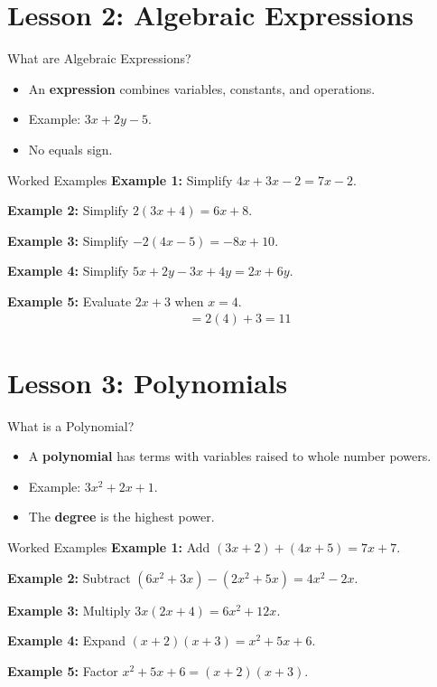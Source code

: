 \documentclass{beamer}
\begin{document}
\section{Lesson 2: Algebraic Expressions}

\begin{frame}{What are Algebraic Expressions?}
\begin{itemize}
    \item An \textbf{expression} combines variables, constants, and operations.
    \item Example: $3x + 2y - 5$.
    \item No equals sign.
\end{itemize}
\end{frame}

\begin{frame}{Worked Examples}
\textbf{Example 1:} Simplify $4x + 3x - 2 = 7x - 2$.

\textbf{Example 2:} Simplify $2(3x + 4) = 6x + 8$.

\textbf{Example 3:} Simplify $-2(4x - 5) = -8x + 10$.

\textbf{Example 4:} Simplify $5x + 2y - 3x + 4y = 2x + 6y$.

\textbf{Example 5:} Evaluate $2x + 3$ when $x = 4$.
\begin{align*}
  &= 2(4) + 3 = 11
\end{align*}
\end{frame}

\section{Lesson 3: Polynomials}

\begin{frame}{What is a Polynomial?}
\begin{itemize}
    \item A \textbf{polynomial} has terms with variables raised to whole number powers.
    \item Example: $3x^2 + 2x + 1$.
    \item The \textbf{degree} is the highest power.
\end{itemize}
\end{frame}

\begin{frame}{Worked Examples}
\textbf{Example 1:} Add $(3x + 2) + (4x + 5) = 7x + 7$.

\textbf{Example 2:} Subtract $(6x^2 + 3x) - (2x^2 + 5x) = 4x^2 - 2x$.

\textbf{Example 3:} Multiply $3x(2x + 4) = 6x^2 + 12x$.

\textbf{Example 4:} Expand $(x + 2)(x + 3) = x^2 + 5x + 6$.

\textbf{Example 5:} Factor $x^2 + 5x + 6 = (x + 2)(x + 3)$.
\end{frame}
\end{document}

